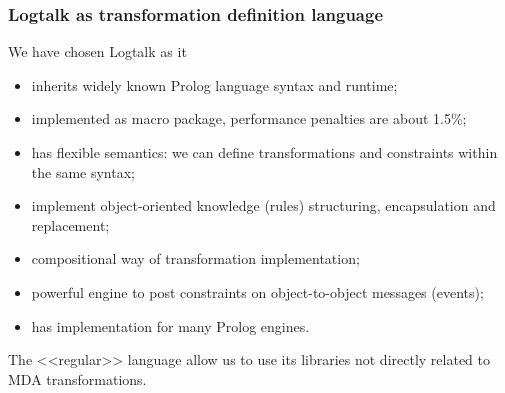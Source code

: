 \documentclass[10pt]{beamer}
\begin{document}
\begin{frame}
  \frametitle{Logtalk as transformation definition language}
  We have chosen Logtalk as it
  \begin{itemize}
  \item inherits widely known Prolog language syntax and runtime;
  \item implemented as macro package, performance penalties are about 1.5\%;
  \item has flexible semantics: we can define transformations and constraints within the same syntax;
  \item implement object-oriented knowledge (rules) structuring, encapsulation and replacement;
  \item compositional way of transformation implementation;
  \item powerful engine to post constraints on object-to-object messages (events);
  \item has implementation for many Prolog engines.
  \end{itemize}
  The <<regular>> language allow us to use its libraries not directly related to MDA transformations.
\end{frame}
\end{document}

